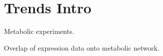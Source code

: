 \chapter{Trends Intro}

Metabolic experiments.

Overlap of expression data onto metabolic network.



